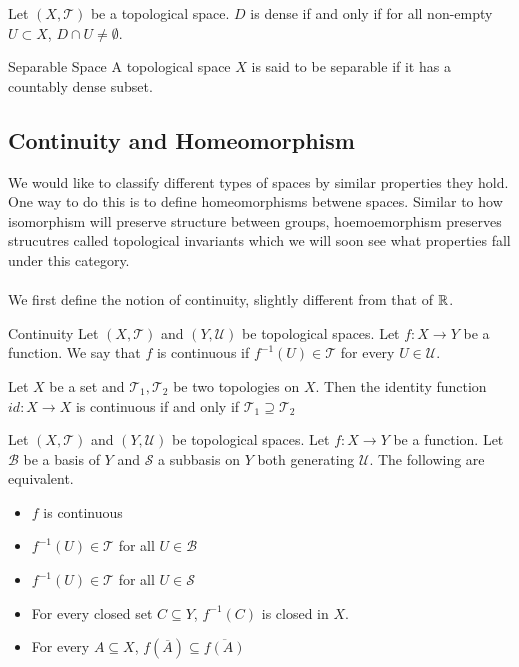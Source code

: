 \documentclass[a4paper]{article}
\begin{document}
\begin{prp}{}{} Let $(X,\mathcal{T})$ be a topological space. $D$ is dense if and only if for all non-empty $U\subset X$, $D\cap U\neq\emptyset$. 
\end{prp}

\begin{defn}{Separable Space}{} A topological space $X$ is said to be separable if it has a countably dense subset. 
\end{defn}

\subsection{Continuity and Homeomorphism}
We would like to classify different types of spaces by similar properties they hold. One way to do this is to define homeomorphisms betwene spaces. Similar to how isomorphism will preserve structure between groups, hoemoemorphism preserves strucutres called topological invariants which we will soon see what properties fall under this category. \\~\\
We first define the notion of continuity, slightly different from that of $\mathbb{R}$. 
\begin{defn}{Continuity}{} Let $(X,\mathcal{T})$ and $(Y,\mathcal{U})$ be topological spaces. Let $f:X\to Y$ be a function. We say that $f$ is continuous if $f^{-1}(U)\in\mathcal{T}$ for every $U\in\mathcal{U}$. 
\end{defn}

\begin{prp}{}{} Let $X$ be a set and $\mathcal{T}_1,\mathcal{T}_2$ be two topologies on $X$. Then the identity function $id:X\to X$ is continuous if and only if $\mathcal{T}_1\supseteq\mathcal{T}_2$
\end{prp}

\begin{prp}{}{} Let $(X,\mathcal{T})$ and $(Y,\mathcal{U})$ be topological spaces. Let $f:X\to Y$ be a function. Let $\mathcal{B}$ be a basis of $Y$ and $\mathcal{S}$ a subbasis on $Y$ both generating $\mathcal{U}$. The following are equivalent. 
\begin{itemize}
\item $f$ is continuous
\item $f^{-1}(U)\in\mathcal{T}$ for all $U\in\mathcal{B}$
\item $f^{-1}(U)\in\mathcal{T}$ for all $U\in\mathcal{S}$
\item For every closed set $C\subseteq Y$, $f^{-1}(C)$ is closed in $X$. 
\item For every $A\subseteq X$, $f(\overline{A})\subseteq\overline{f(A)}$
\end{itemize}
\end{prp}
\end{document}
